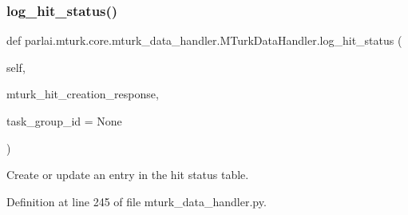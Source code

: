 \subsubsection{\texorpdfstring{log\+\_\+hit\+\_\+status()}{log\_hit\_status()}}
{\footnotesize\ttfamily def parlai.\+mturk.\+core.\+mturk\+\_\+data\+\_\+handler.\+M\+Turk\+Data\+Handler.\+log\+\_\+hit\+\_\+status (\begin{DoxyParamCaption}\item[{}]{self,  }\item[{}]{mturk\+\_\+hit\+\_\+creation\+\_\+response,  }\item[{}]{task\+\_\+group\+\_\+id = {\ttfamily None} }\end{DoxyParamCaption})}

\begin{DoxyVerb}Create or update an entry in the hit status table.
\end{DoxyVerb}
 

Definition at line 245 of file mturk\+\_\+data\+\_\+handler.\+py.


